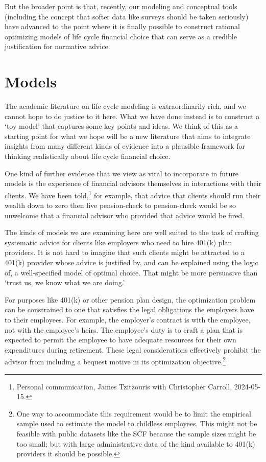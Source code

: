 \documentclass{article}
\begin{document}
But the broader point is that, recently, our modeling and conceptual tools (including the concept that softer data like surveys should be taken seriously) have advanced to the point where it is finally possible to construct rational optimizing models of life cycle financial choice that can serve as a credible justification for normative advice.

\section{Models}

The academic literature on life cycle modeling is extraordinarily rich, and we cannot hope to do justice to it here. What we have done instead is to construct a `toy model' that captures some key points and ideas. We think of this as a starting point for what we hope will be a new literature that aims to integrate insights from many different kinds of evidence into a plausible framework for thinking realistically about life cycle financial choice.

One kind of further evidence that we view as vital to incorporate in future models is the experience of financial advisors themselves in interactions with their clients. We have been told,\footnote{Personal communication, James Tzitzouris with Christopher Carroll, 2024-05-15.} for example, that advice that clients should run their wealth down to zero then live pension-check to pension-check would be so unwelcome that a financial advisor who provided that advice would be fired.

The kinds of models we are examining here are well suited to the task of crafting systematic advice for clients like employers who need to hire 401(k) plan providers. It is not hard to imagine that such clients might be attracted to a 401(k) provider whose advice is justified by, and can be explained using the logic of, a well-specified model of optimal choice.  That might be more persuasive than `trust us, we know what we are doing.'

For purposes like 401(k) or other pension plan design, the optimization problem can be constrained to one that satisfies the legal obligations the employers have to their employees. For example, the employer's contract is with the employee, not with the employee's heirs. The employee's duty is to craft a plan that is expected to permit the employee to have adequate resources for their own expenditures during retirement. These legal considerations effectively prohibit the advisor from including a bequest motive in its optimization objective.\footnote{One way to accommodate this requirement would be to limit the empirical sample used to estimate the model to childless employees. This might not be feasible with public datasets like the SCF because the sample sizes might be too small; but with large administrative data of the kind available to 401(k) providers it should be possible.}
\end{document}

